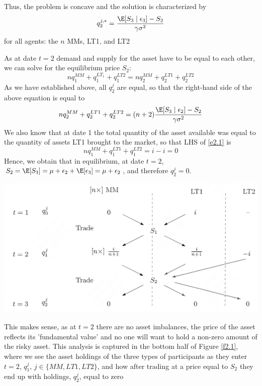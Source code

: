 \documentclass[11pt]{article}
\begin{document}
Thus, the problem is concave and the solution is characterized by
\begin{equation*}
q_2^{j,*}=\frac{\E[S_3\mid\epsilon_3]-S_2}{\gamma\sigma^2}
\end{equation*}
for all agents: the \(n\) MMs, LT1, and LT2

As at date \(t=2\) demand and supply for the asset have to be equal to each other, we can solve for
the equilibrium price \(S_2\):
\begin{equation}
\label{e2.1}
nq_1^{MM}+q_1^{LT_1}+q_1^{LT2}=nq_2^{MM}+q_2^{LT1}+q_2^{LT2}
\end{equation}
As we have established above, all \(q_2^j\) are equal, so that the right-hand side of the above
equation is equal to
\begin{equation}
\label{e2.2}
nq_2^{MM}+q_2^{LT1}+q_2^{LT2}=(n+2)\frac{\E[S_3\mid\epsilon_2]-S_2}{\gamma\sigma^2}
\end{equation}
We also know that at date 1 the total quantity of the asset available was equal to the quantity of
assets LT1 brought to the market, so that LHS of \eqref{e2.1} is
\begin{equation*}
nq_1^{MM}+q_1^{LT1}+q_1^{LT2}=i-i=0
\end{equation*}
Hence, we obtain that in equilibrium, at date \(t=2\),
\(S_2=\E[S_3]=\mu+\epsilon_2+\E[\epsilon_3]=\mu+\epsilon_2\), and therefore \(q_2^j=0\).

\begin{center}
\includegraphics[width=.8\textwidth]{../images/Misc/19.png}
\end{center}


This makes sense, as at \(t=2\) there are no asset imbalances, the price of the asset reflects its
'fundamental value' and no one will want to hold a non-zero amount of the risky asset. This analysis
is captured in the bottom half of Figure \ref{f2.1}, where we see the asset holdings of the three types
of participants as they enter \(t=2\), \(q_1^j\), \(j\in\{MM,LT1,LT2\}\), and how after trading at a
price equal to \(S_2\) they end up with holdings, \(q_2^j\), equal to zero
\end{document}
